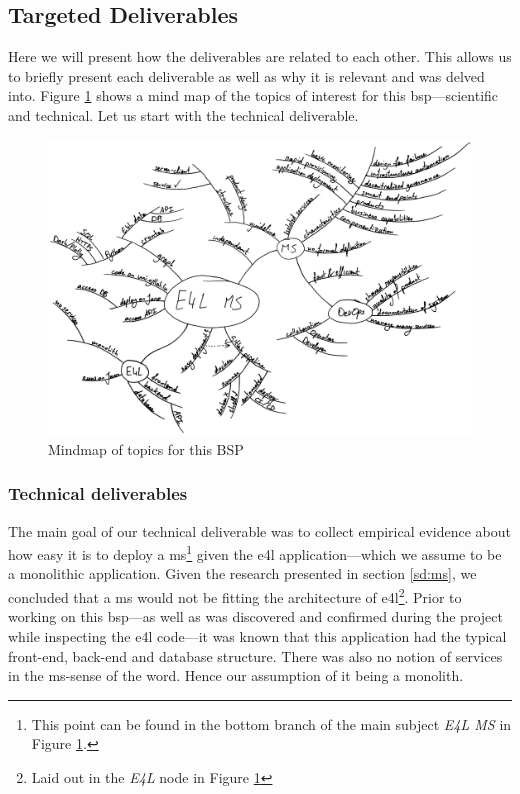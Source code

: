 \subsection{Targeted Deliverables}
\label{sec-deliverables}

Here we will present how the deliverables are related to each other.
This allows us to briefly present each deliverable as well as why it
is relevant and was delved into. Figure \ref{fig:mindmap} shows a
mind map of the topics of interest for this \gls{bsp}---scientific and
technical. Let us start with the technical deliverable.

\begin{figure}
	\centering
	\includegraphics[width=\linewidth]{images/mindmap.png}
	\caption{Mindmap of topics for this BSP}
	\label{fig:mindmap}
\end{figure}


\subsubsection{Technical deliverables}

The main goal of our technical deliverable was to collect empirical
evidence about how easy it is to deploy a \gls{ms}\footnote{This point
can be found in the bottom branch of the main subject \textit{E4L MS} in Figure
\ref{fig:mindmap}.} given the \gls{e4l} application---which we assume
to be a monolithic application. Given the research presented in
section \ref{sd:ms}, we concluded that a \gls{ms} would not be fitting
the architecture of \gls{e4l}\footnote{Laid out in the \textit{E4L}
node in Figure \ref{fig:mindmap}}. Prior to working on this \gls{bsp}---as
well as was discovered and confirmed during the project while
inspecting the \gls{e4l} code---it was known that this application had
the typical front-end, back-end and database structure. There was also
no notion of services in the \gls{ms}-sense of the word. Hence our
assumption of it being a monolith.

